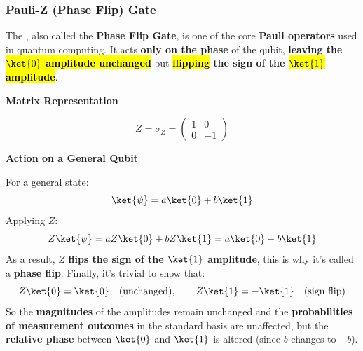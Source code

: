 \subsubsection{Pauli-Z (Phase Flip) Gate}\label{sec:pauli-z-phase-flip-gate}

The , also called the \textbf{Phase Flip Gate}, is one of the core \textbf{Pauli operators} used in quantum computing. It acts \textbf{only on the phase} of the qubit, \textbf{leaving the \hl{$\ket{0}$ amplitude unchanged}} but \textbf{\hl{flipping} the sign of the \hl{$\ket{1}$ amplitude}}.

\highspace
\begin{flushleft}
    \textcolor{Green3}{ \textbf{Matrix Representation}}
\end{flushleft}
\begin{equation}
    Z = \sigma_{Z} = 
    \begin{pmatrix}
        1 & 0 \\
        0 & -1
    \end{pmatrix}
\end{equation}

\highspace
\begin{flushleft}
    \textcolor{Green3}{ \textbf{Action on a General Qubit}}
\end{flushleft}
For a general state:
\begin{equation*}
    \ket{\psi} = a\ket{0} + b\ket{1}
\end{equation*}
Applying $Z$:
\begin{equation*}
    Z\ket{\psi} = aZ\ket{0} + bZ\ket{1} = a\ket{0} - b\ket{1}
\end{equation*}
As a result, $Z$ \textbf{flips the sign of the $\ket{1}$ amplitude}, this is why it's called a \textbf{phase flip}. Finally, it's trivial to show that:
\begin{equation*}
    Z\ket{0} = \ket{0} \hspace{1em} \text{(unchanged)}, \hspace{2em} Z\ket{1} = -\ket{1} \hspace{1em} \text{(sign flip)}
\end{equation*}
So the \textbf{magnitudes} of the amplitudes remain unchanged and the \textbf{probabilities of measurement outcomes} in the standard basis are unaffected, but the \textbf{relative phase} between $\ket{0}$ and $\ket{1}$ is altered (since $b$ changes to $-b$).

